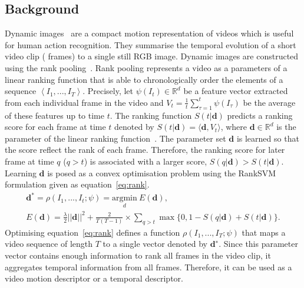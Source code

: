 \subsection{Background}
\label{sec.background}
Dynamic images~\cite{bilen2016dynamic,Bilen2017} are a compact motion representation of videos which is useful for human action recognition. 
They summarise the temporal evolution of a short video clip ( frames) to a single still RGB image. 
Dynamic images are constructed using the rank pooling~\cite{FernandoGMGT15}. 
Rank pooling represents a video as a parameters of a linear ranking function that is able to chronologically order the elements of a sequence $\left<I_1, ..., I_T\right>$.
Precisely, let $\psi(I_t) \in \mathbb{R}^{d}$ be a feature vector extracted from each individual frame in the video and $V_t = \frac{1}{t} \sum_{\tau=1}^t \psi(I_\tau)$ be the average of these features up to time $t$. 
The ranking function $S(t|\mathbf{d})$ predicts a ranking score for each frame at time $t$ denoted by $S(t|\mathbf{d}) = \langle \mathbf{d}, V_t\rangle$, where $\mathbf{d} \in \mathbb{R}^d$ is the parameter of the linear ranking function~\cite{FernandoGMGT15}.
The parameter set $\mathbf{d}$ is learned so that the score reflect the rank of each frame.
Therefore, the ranking score for later frame at time $q$ ($q>t$) is associated with a larger score, \ie $S(q|\mathbf{d}) > S(t|\mathbf{d})$.
Learning $\mathbf{d}$ is posed as a convex optimisation problem using the RankSVM~\cite{smola2004tutorial} formulation given as equation~\ref{eq:rank}.
%
\begin{equation}
 \begin{multlined}
\mathbf{d}^*  = \rho(I_1, ... , I_t ; \psi) = \underset{d}{\mathrm{argmin}}~ E(\mathbf{d}), \\
E(\mathbf{d}) = \frac{\lambda}{2}||\mathbf{d}||^2 + 
\frac{2}{T(T-1)} \times \displaystyle \sum_{q>t} \max\{0, 1 - S(q|\mathbf{d}) + S(t|\mathbf{d})\}.
\end{multlined}
\label{eq:rank}
\end{equation}
%
Optimising equation~\ref{eq:rank} defines a function $\rho(I_1 , . . . , I_T ; \psi)$ that maps a video sequence of length $T$ to a single vector denoted by $\mathbf{d^∗}$. 
Since this parameter vector contains enough information to rank all frames in the video clip, it aggregates temporal information from all frames. 
Therefore, it  can be used as a video motion descriptor or a temporal descriptor.

